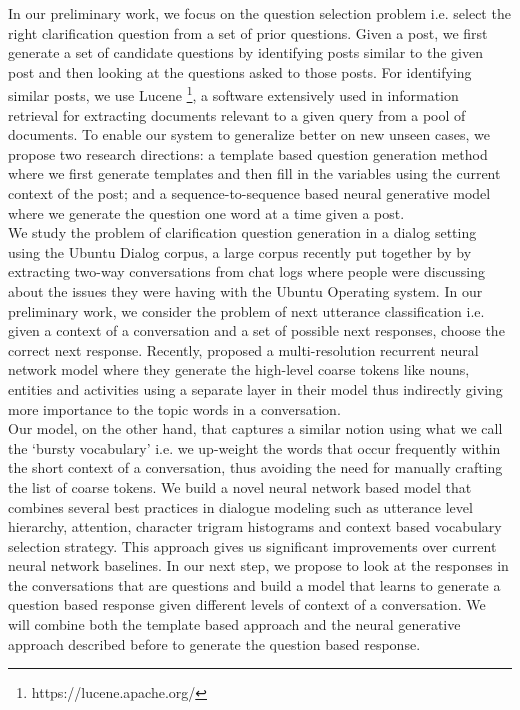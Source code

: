 \documentclass[11pt]{report}
\renewcommand\cite{\citep}	%
\newcommand\newcite{\citet}	%
\begin{document}
\noindent
In our preliminary work, we focus on the question selection problem i.e. select the right clarification question from a set of prior questions. Given a post, we first generate a set of candidate questions by identifying posts similar to the given post and then looking at the questions asked to those posts. For identifying similar posts, we use Lucene \footnote{https://lucene.apache.org/}, a software extensively used in information retrieval for extracting documents relevant to a given query from a pool of documents. To enable our system to generalize better on new unseen cases, we propose two research directions: a template based question generation method where we first generate templates and then fill in the variables using the current context of the post; and a sequence-to-sequence based neural generative model where we generate the question one word at a time given a post. \\

\noindent
We study the problem of clarification question generation in a dialog setting using the Ubuntu Dialog corpus, a large corpus recently put together by \newcite{lowe2015ubuntu} by extracting two-way conversations from chat logs where people were discussing about the issues they were having with the Ubuntu Operating system. In our preliminary work, we consider the problem of next utterance classification i.e. given a context of a conversation and a set of possible next responses, choose the correct next response. Recently, \cite{serban2016multiresolution} proposed a multi-resolution recurrent neural network model where they generate the high-level coarse tokens like nouns, entities and activities using a separate layer in their model thus indirectly giving more importance to the topic words in a conversation. \\

\noindent
Our model, on the other hand, that captures a similar notion using what we call the `bursty vocabulary' i.e. we up-weight the words that occur frequently within the short context of a conversation, thus avoiding the need for manually crafting the list of coarse tokens. We build a novel neural network based model that combines several best practices in dialogue modeling such as utterance level hierarchy, attention, character trigram histograms and context based vocabulary selection strategy. This approach gives us significant improvements over current neural network baselines. In our next step, we propose to look at the responses in the conversations that are questions and build a model that learns to generate a question based response given different levels of context of a conversation. We will combine both the template based approach and the neural generative approach described before to generate the question based response. \\
\end{document}
